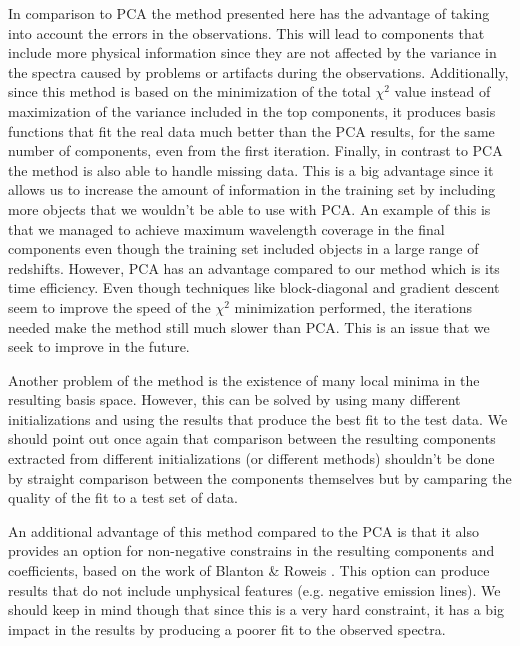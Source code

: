 \documentclass[apj]{emulateapj}
\begin{document}
In comparison to PCA the method presented here has the advantage of taking into account the errors in the observations. This will lead to components that include more physical information since they are not affected by the variance in the spectra caused by problems or artifacts during the observations. Additionally, since this method is based on the minimization of the total $\chi^2$ value instead of maximization of the variance included in the top components, it produces basis functions that fit the real data much better than the PCA results, for the same number of components, even from the first iteration. Finally, in contrast to PCA the method is also able to handle missing data. This is a big advantage since it allows us to increase the amount of information in the training set by including more objects that we wouldn't be able to use with PCA. An example of this is that we managed to achieve maximum wavelength coverage in the final components even though the training set included objects in a large range of redshifts. However, PCA has an advantage compared to our method which is its time efficiency. Even though techniques like block-diagonal and gradient descent seem to improve the speed of the $\chi^2$ minimization performed, the iterations needed make the method still much slower than PCA. This is an issue that we seek to improve in the future.

Another problem of the method is the existence of many local minima in the resulting basis space. However, this can be solved by using many different initializations and using the results that produce the best fit to the test data. We should point out once again that comparison between the resulting components extracted from different initializations (or different methods) shouldn't be done by straight comparison between the components themselves but by camparing the quality of the fit to a test set of data.

An additional advantage of this method compared to the PCA is that it also provides an option for non-negative constrains in the resulting components and coefficients, based on the work of Blanton \& Roweis \cite{blanton}. This option can produce results that do not include unphysical features (e.g. negative emission lines). We should keep in mind though that since this is a very hard constraint, it has a big impact in the results by producing a poorer fit to the observed spectra.
\end{document}
